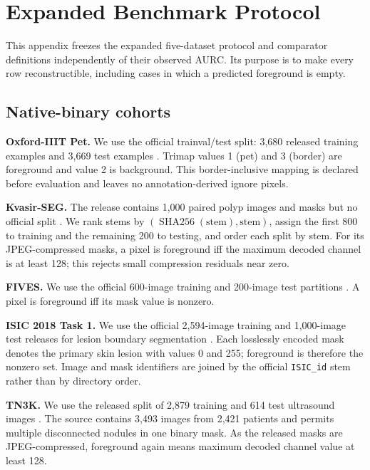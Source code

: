\section{Expanded Benchmark Protocol}
\label{app:benchmark-protocol}

This appendix freezes the expanded five-dataset protocol and comparator
definitions independently of their observed AURC. Its purpose is to make every
row reconstructible, including cases in which a predicted foreground is empty.

\subsection{Native-binary cohorts}

\noindent\textbf{Oxford-IIIT Pet.}
We use the official trainval/test split: 3,680 released training examples and
3,669 test examples \citep{parkhi2012cats}. Trimap values 1 (pet) and 3 (border)
are foreground and value 2 is background. This border-inclusive mapping is
declared before evaluation and leaves no annotation-derived ignore pixels.

\noindent\textbf{Kvasir-SEG.}
The release contains 1,000 paired polyp images and masks but no official split
\citep{jha2020kvasir}. We rank stems by
\((\operatorname{SHA256}(\text{stem}),\text{stem})\), assign the first 800 to
training and the remaining 200 to testing, and order each split by stem. For its
JPEG-compressed masks, a pixel is foreground iff the maximum decoded channel is
at least 128; this rejects small compression residuals near zero.

\noindent\textbf{FIVES.}
We use the official 600-image training and 200-image test partitions
\citep{jin2022fives}. A pixel is foreground iff its mask value is nonzero.

\noindent\textbf{ISIC 2018 Task 1.}
We use the official 2,594-image training and 1,000-image test releases for lesion
boundary segmentation \citep{codella2019isic,tschandl2018ham10000,
isic2018task1}. Each losslessly encoded mask denotes the primary skin lesion
with values 0 and 255; foreground is therefore the nonzero set. Image and mask
identifiers are joined by the official \texttt{ISIC\_id} stem rather than by
directory order.

\noindent\textbf{TN3K.}
We use the released split of 2,879 training and 614 test ultrasound images
\citep{gong2021multitask,gong2023thyroid}. The source contains 3,493 images from
2,421 patients and permits multiple disconnected nodules in one binary mask. As
the released masks are JPEG-compressed, foreground again means maximum decoded
channel value at least 128.

